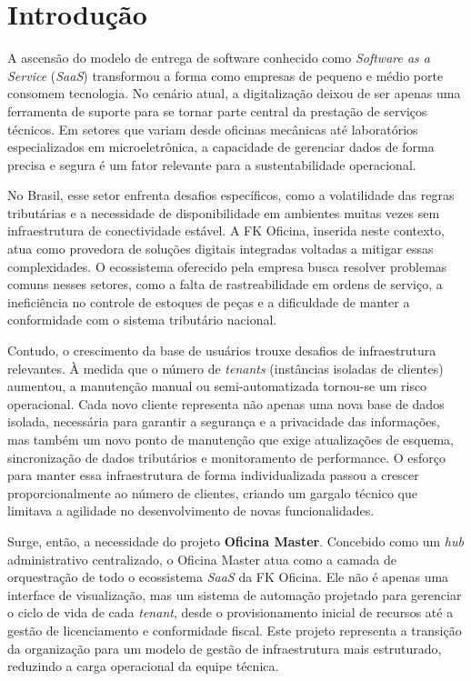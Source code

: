 
\chapter{Introdução}
\label{cap:introducao}

A ascensão do modelo de entrega de software conhecido como \textit{Software as a Service} (\textit{SaaS}) transformou a forma como empresas de pequeno e médio porte consomem tecnologia. No cenário atual, a digitalização deixou de ser apenas uma ferramenta de suporte para se tornar parte central da prestação de serviços técnicos. Em setores que variam desde oficinas mecânicas até laboratórios especializados em microeletrônica, a capacidade de gerenciar dados de forma precisa e segura é um fator relevante para a sustentabilidade operacional.

No Brasil, esse setor enfrenta desafios específicos, como a volatilidade das regras tributárias e a necessidade de disponibilidade em ambientes muitas vezes sem infraestrutura de conectividade estável. A FK Oficina, inserida neste contexto, atua como provedora de soluções digitais integradas voltadas a mitigar essas complexidades. O ecossistema oferecido pela empresa busca resolver problemas comuns nesses setores, como a falta de rastreabilidade em ordens de serviço, a ineficiência no controle de estoques de peças e a dificuldade de manter a conformidade com o sistema tributário nacional.

Contudo, o crescimento da base de usuários trouxe desafios de infraestrutura relevantes. À medida que o número de \textit{tenants} (instâncias isoladas de clientes) aumentou, a manutenção manual ou semi-automatizada tornou-se um risco operacional. Cada novo cliente representa não apenas uma nova base de dados isolada, necessária para garantir a segurança e a privacidade das informações, mas também um novo ponto de manutenção que exige atualizações de esquema, sincronização de dados tributários e monitoramento de performance. O esforço para manter essa infraestrutura de forma individualizada passou a crescer proporcionalmente ao número de clientes, criando um gargalo técnico que limitava a agilidade no desenvolvimento de novas funcionalidades.

Surge, então, a necessidade do projeto \textbf{Oficina Master}. Concebido como um \textit{hub} administrativo centralizado, o Oficina Master atua como a camada de orquestração de todo o ecossistema \textit{SaaS} da FK Oficina. Ele não é apenas uma interface de visualização, mas um sistema de automação projetado para gerenciar o ciclo de vida de cada \textit{tenant}, desde o provisionamento inicial de recursos até a gestão de licenciamento e conformidade fiscal. Este projeto representa a transição da organização para um modelo de gestão de infraestrutura mais estruturado, reduzindo a carga operacional da equipe técnica.


